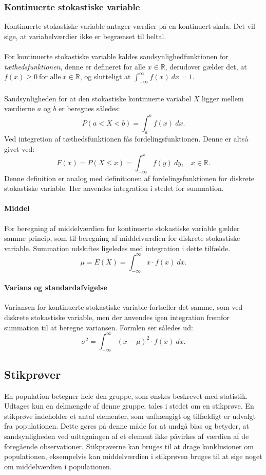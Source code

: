 \subsubsection{Kontinuerte stokastiske variable}
Kontinuerte stokastiske variable antager værdier på en kontinuert skala. Det vil sige, at variabelværdier ikke er begrænset til heltal. 
\\
\\
\noindent For kontinuerte stokastiske variable kaldes sandsynlighedfunktionen for \emph{tæthedsfunktionen}, denne er defineret for alle $x \in \mathbb{R}$, derudover gælder det, at $f(x) \ge 0 \ \text{for alle} \ x \in \mathbb{R}$, 
og slutteligt at $\int_{-\infty}^{\infty} f(x)\ dx = 1$.
\\
\\ 
\noindent Sandsynligheden for at den stokastiske kontinuerte variabel $X$ ligger mellem værdierne $a$ og $b$ er beregnes således: $$P(a<X<b)=\int_{a}^{b}f(x)\ dx.$$ 
\noindent Ved integretion af tæthedsfunktionen fås fordelingsfunktionen. Denne er altså givet ved:
$$F(x)=P(X \le x) = \int_{-\infty}^{x}f(y)\ dy, \ \ \ \ x\in \mathbb{R}.$$
\noindent Denne definition er analog med definitionen af fordelingsfunktionen for diskrete stokastiske variable. Her anvendes integration i stedet for summation.

\paragraph{Middel} For beregning af middelværdien for kontinuerte stokastiske variable gælder samme princip, som til beregning af middelværdien for diskrete stokastiske variable. Summation udskiftes ligeledes med integration i dette tilfælde.
$$\mu=E(X)=\int_{-\infty}^{\infty}x \cdot f(x)\ dx. $$

\paragraph{Varians og standardafvigelse} Variansen for kontinuerte stokastiske variable fortæller det samme, som ved diskrete stokastiske variable, men der anvendes igen integration fremfor summation til at beregne variansen. Formlen ser således ud:
$$\sigma^2=\int_{-\infty}^{\infty}(x-\mu)^2 \cdot f(x)\ dx.$$ 


\subsection{Stikprøver}
En population betegner hele den gruppe, som ønskes beskrevet med statistik. Udtages kun en delmængde af denne gruppe, tales i stedet om en stikprøve.
En stikprøve indeholder et antal elementer, som uafhængigt og tilfældigt er udvalgt fra populationen. Dette gøres på denne måde for at undgå bias og betyder, at sandsynligheden ved udtagningen af et element ikke påvirkes af værdien af de foregående observationer.
Stikprøverne kan bruges til at drage konklusioner om populationen, eksempelvis kan middelværdien i stikprøven bruges til at sige noget om middelværdien i populationen. 


